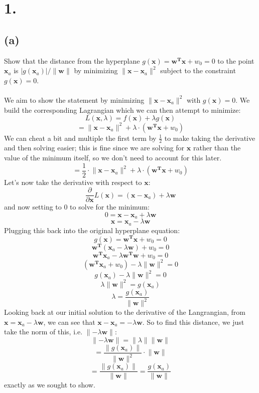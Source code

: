 \documentclass{article}
\begin{document}
\thispagestyle{firstpageheader}
{\Large 

\section*{1.}

\subsection*{(a)} 
Show that the distance from the hyperplane \(g(\mathbf{x}) = \mathbf{w}^\mathbf{T} \mathbf{x} + w_0 = 0\) to the point \(\mathbf{x}_a\) is \(|g(\mathbf{x}_a)| / \lVert \mathbf{w} \rVert\) by minimizing \(\lVert \mathbf{x} - \mathbf{x}_a \rVert^2\) subject to the constraint \(g(\mathbf{x}) = 0\). \\ \\
We aim to show the statement by minimizing \(\lVert \mathbf{x} - \mathbf{x}_a \rVert^2\) with \(g(\mathbf{x}) = 0\). We build the corresponding Lagrangian which we can then attempt to minimize:
\[
  L(\mathbf{x}, \lambda) = f(\mathbf{x}) + \lambda g(\mathbf{x})
\]
\[
  = \lVert \mathbf{x} - \mathbf{x}_a \rVert^2 + \lambda \cdot (\mathbf{w}^\mathbf{T} \mathbf{x} + w_0)
\]
We can cheat a bit and multiple the first term by \(\frac{1}{2}\) to make taking the derivative and then solving easier; this is fine since we are solving for \(\mathbf{x}\) rather than the value of the minimum itself, so we don't need to account for this later. 
\[
  = \frac{1}{2} \cdot \lVert \mathbf{x} - \mathbf{x}_a \rVert^2 + \lambda \cdot (\mathbf{w}^\mathbf{T} \mathbf{x} + w_0)
\]
Let's now take the derivative with respect to \(\mathbf{x}\):
\[
  \frac{\partial}{\partial \mathbf{x}} L(\mathbf{x}) = (\mathbf{x} - \mathbf{x}_a) + \lambda \mathbf{w}
\]
and now setting to 0 to solve for the minimum:
\[
  0 = \mathbf{x} - \mathbf{x}_a + \lambda \mathbf{w}
\]
\[
  \mathbf{x} = \mathbf{x}_a - \lambda \mathbf{w}
\]
Plugging this back into the original hyperplane equation:
\[
  g(\mathbf{x}) = \mathbf{w^T x} + w_0 = 0
\]
\[
  \mathbf{w^T} (\mathbf{x}_a - \lambda \mathbf{w}) + w_0 = 0
\]
\[
  \mathbf{w^T} \mathbf{x}_a - \lambda \mathbf{w^T} \mathbf{w} + w_0 = 0
\]
\[
  (\mathbf{w^T} \mathbf{x}_a + w_0) - \lambda \lVert \mathbf{w} \rVert^2 = 0
\]
\[
  g(\mathbf{x}_a) - \lambda \lVert \mathbf{w} \rVert^2 = 0
\]
\[
  \lambda \lVert \mathbf{w} \rVert^2 = g(\mathbf{x}_a)
\]
\[
  \lambda = \frac{g(\mathbf{x}_a)}{\lVert \mathbf{w} \rVert^2}
\]
Looking back at our initial solution to the derivative of the Langrangian, from \(\mathbf{x} = \mathbf{x}_a - \lambda \mathbf{w}\), we can see that \(\mathbf{x} - \mathbf{x}_a = -\lambda \mathbf{w}\). So to find this distance, we just take the norm of this, i.e. \(\lVert -\lambda \mathbf{w} \rVert\):
\[
  \lVert -\lambda \mathbf{w} \rVert = \lVert \lambda \rVert \lVert \mathbf{w} \rVert
\]
\[
  = \frac{\lVert g(\mathbf{x}_a) \rVert}{\lVert \mathbf{w} \rVert^2}  \cdot \lVert \mathbf{w} \rVert
\]
\[
  = \frac{\lVert g(\mathbf{x}_a) \rVert}{\lVert \mathbf{w} \rVert} = \frac{g(\mathbf{x}_a)}{\lVert \mathbf{w} \rVert} 
\]
exactly as we sought to show. 

}
\end{document}

